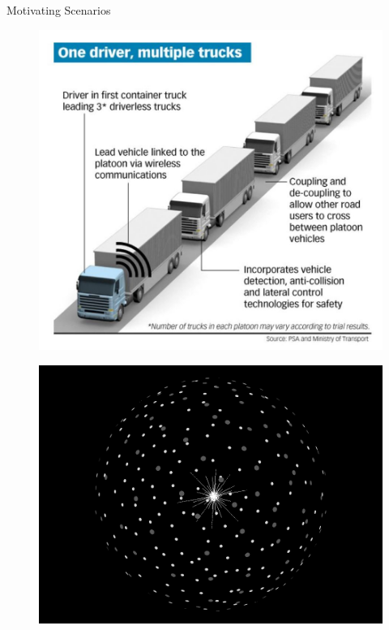 \documentclass{beamer}
\begin{document}
\begin{frame}{Motivating Scenarios}
\begin{minipage}{0.45\textwidth}
\begin{figure}
		\end{figure}
	\end{minipage}
	\hspace{0.05cm}
	\begin{minipage}{0.45\textwidth}
		\begin{figure}
			\includegraphics[height=0.4\textheight]{figures/truck_platoon.jpg}
		\end{figure}
		\begin{figure}
			\includegraphics[scale=0.1]{figures/Dyson_swarm.png}		
			\label{fig:Dyson_swarms}
		\end{figure}	
	\end{minipage}
	

\end{frame}
\end{document}
